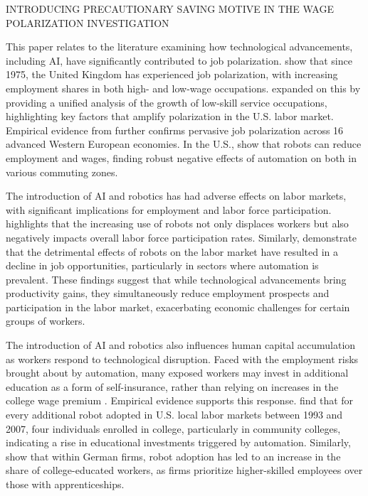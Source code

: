 \documentclass[12pt]{article}
\begin{document}
INTRODUCING PRECAUTIONARY SAVING MOTIVE IN THE WAGE POLARIZATION INVESTIGATION \citet{autor_polarization_2006}


This paper relates to the literature examining how technological advancements,
including AI, have significantly contributed to job polarization.
\citet{Goos2007} show that since 1975, the United Kingdom has experienced
job polarization, with increasing employment shares in both high-
and low-wage occupations. \citet{Autor2013} expanded on this by providing
a unified analysis of the growth of low-skill service occupations,
highlighting key factors that amplify polarization in the U.S. labor
market. Empirical evidence from \citet{Goos2014} further confirms
pervasive job polarization across 16 advanced Western European economies.
In the U.S., \citet{Acemoglu2020} show that robots can reduce employment
and wages, finding robust negative effects of automation on both in
various commuting zones.

The introduction of AI and robotics has had adverse effects on labor
markets, with significant implications for employment and labor force
participation. \citet{Lerch2021} highlights that the increasing use
of robots not only displaces workers but also negatively impacts overall
labor force participation rates. Similarly, \citet{Faber2022} demonstrate
that the detrimental effects of robots on the labor market have resulted
in a decline in job opportunities, particularly in sectors where automation
is prevalent. These findings suggest that while technological advancements
bring productivity gains, they simultaneously reduce employment prospects
and participation in the labor market, exacerbating economic challenges
for certain groups of workers.

The introduction of AI and robotics also influences human capital
accumulation as workers respond to technological disruption. Faced
with the employment risks brought about by automation, many exposed
workers may invest in additional education as a form of self-insurance,
rather than relying on increases in the college wage premium \parencites{Atkin2016,Beaudry2016}. Empirical evidence supports this response.
\citet{DiGiacomo2023} find that for every additional robot adopted
in U.S. local labor markets between 1993 and 2007, four individuals
enrolled in college, particularly in community colleges, indicating
a rise in educational investments triggered by automation. Similarly,
\citet{Dauth2021} show that within German firms, robot adoption has
led to an increase in the share of college-educated workers, as firms
prioritize higher-skilled employees over those with apprenticeships. 
\end{document}
